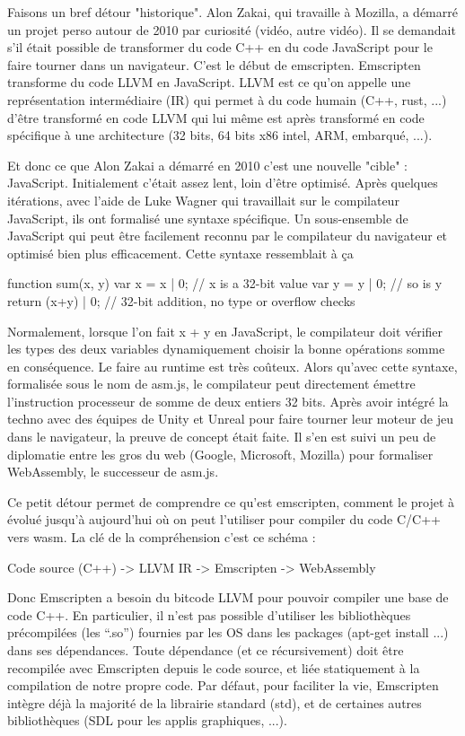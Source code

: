 Faisons un bref détour "historique". Alon Zakai, qui travaille à Mozilla, a démarré un projet perso autour de 2010 par curiosité (vidéo, autre vidéo). Il se demandait s’il était possible de transformer du code C++ en du code JavaScript pour le faire tourner dans un navigateur. C’est le début de emscripten. Emscripten transforme du code LLVM en JavaScript. LLVM est ce qu’on appelle une représentation intermédiaire (IR) qui permet à du code humain (C++, rust, ...) d’être transformé en code LLVM qui lui même est après transformé en code spécifique à une architecture (32 bits, 64 bits x86 intel, ARM, embarqué, ...).

Et donc ce que Alon Zakai a démarré en 2010 c’est une nouvelle "cible" : JavaScript. Initialement c’était assez lent, loin d’être optimisé. Après quelques itérations, avec l’aide de Luke Wagner qui travaillait sur le compilateur JavaScript, ils ont formalisé une syntaxe spécifique. Un sous-ensemble de JavaScript qui peut être facilement reconnu par le compilateur du navigateur et optimisé bien plus efficacement. Cette syntaxe ressemblait à ça

function sum(x, y) {
    var x = x | 0;  // x is a 32-bit value
    var y = y | 0;  // so is y
    return (x+y) | 0; // 32-bit addition, no type or overflow checks
}

Normalement, lorsque l’on fait x + y en JavaScript, le compilateur doit vérifier les types des deux variables dynamiquement choisir la bonne opérations somme en conséquence. Le faire au runtime est très coûteux. Alors qu’avec cette syntaxe, formalisée sous le nom de asm.js, le compilateur peut directement émettre l’instruction processeur de somme de deux entiers 32 bits. Après avoir intégré la techno avec des équipes de Unity et Unreal pour faire tourner leur moteur de jeu dans le navigateur, la preuve de concept était faite. Il s’en est suivi un peu de diplomatie entre les gros du web (Google, Microsoft, Mozilla) pour formaliser WebAssembly, le successeur de asm.js.

Ce petit détour permet de comprendre ce qu’est emscripten, comment le projet à évolué jusqu’à aujourd’hui où on peut l’utiliser pour compiler du code C/C++ vers wasm. La clé de la compréhension c’est ce schéma :

Code source (C++) -> LLVM IR -> Emscripten -> WebAssembly

Donc Emscripten a besoin du bitcode LLVM pour pouvoir compiler une base de code C++. En particulier, il n’est pas possible d’utiliser les bibliothèques précompilées (les “.so”) fournies par les OS dans les packages (apt-get install ...) dans ses dépendances. Toute dépendance (et ce récursivement) doit être recompilée avec Emscripten depuis le code source, et liée statiquement à la compilation de notre propre code. Par défaut, pour faciliter la vie, Emscripten intègre déjà la majorité de la librairie standard (std), et de certaines autres bibliothèques (SDL pour les applis graphiques, ...).


